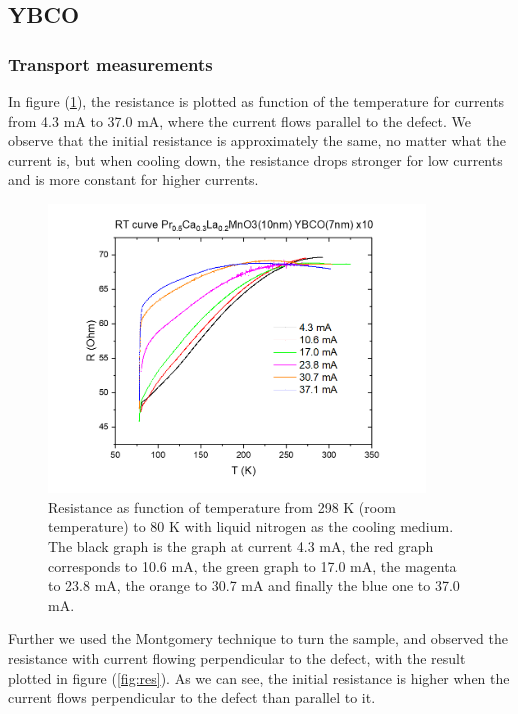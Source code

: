 \documentclass{comjnl}
\begin{document}
\subsection{YBCO}
\subsubsection{Transport measurements}
In figure (\ref{fig:res_norm}), the resistance is plotted as function of the temperature for currents from 4.3 mA to 37.0 mA, where the current flows parallel to the defect. We observe that the initial resistance is approximately the same, no matter what the current is, but when cooling down, the resistance drops stronger for low currents and is more constant for higher currents. 
\begin{figure}[H]
\centering
\includegraphics[width=100mm]{Bilde1.png}
\caption{Resistance as function of temperature from 298 K (room temperature) to 80 K with liquid nitrogen as the cooling medium. The black graph is the graph at current 4.3 mA, the red graph corresponds to 10.6 mA, the green graph to 17.0 mA, the magenta to 23.8 mA, the orange to 30.7 mA and finally the blue one to 37.0 mA. \label{fig:res_norm}}
\end{figure}
Further we used the Montgomery technique to turn the sample, and observed the resistance with current flowing perpendicular to the defect, with the result plotted in figure (\ref{fig:res}). As we can see, the initial resistance is higher when the current flows perpendicular to the defect than parallel to it. 
\end{document}
